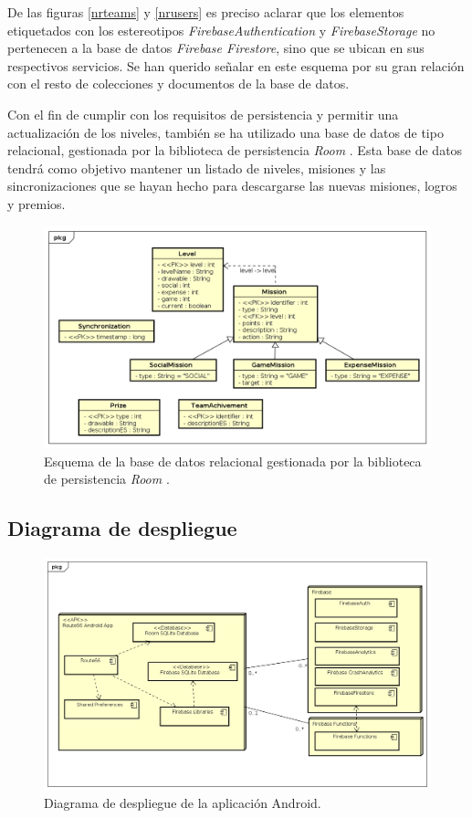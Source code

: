 \documentclass[twoside]{report}
\begin{document}
De las figuras \ref{nrteams} y \ref{nrusers} es preciso aclarar que los elementos etiquetados con los estereotipos \textit{FirebaseAuthentication} y \textit{FirebaseStorage} no pertenecen a la base de datos \textit{Firebase Firestore}, sino que se ubican en sus respectivos servicios. Se han querido señalar en este esquema por su gran relación con el resto de colecciones y documentos de la base de datos.


Con el fin de cumplir con los requisitos de persistencia y permitir una actualización de los niveles, también se ha utilizado una base de datos de tipo relacional, gestionada por la biblioteca de persistencia  \textit{Room} \cite{roompersistence}. Esta base de datos tendrá como objetivo mantener un listado de niveles, misiones y las sincronizaciones que se hayan hecho para descargarse las nuevas misiones, logros y premios.

\begin{figure}[H]
\centering
\includegraphics[scale=0.5]{images/databaseRoom}
\caption{Esquema de la base de datos relacional gestionada por la biblioteca de persistencia \textit{Room} \cite{roompersistence}.}
\end{figure}

\subsection{Diagrama de despliegue}

\begin{figure}[H]
\centering
\includegraphics[scale=0.5]{images/deploymentModel}
\caption{Diagrama de despliegue de la aplicación Android.}
\end{figure}
\end{document}
